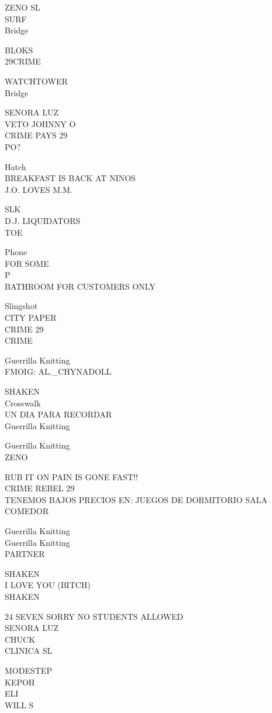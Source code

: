 \documentclass[10pt,letterpaper]{article}
\begin{document}
ZENO SL\\
SURF\\
Bridge

BLOKS\\
29CRIME

WATCHTOWER\\
Bridge

SENORA LUZ\\
VETO JOHNNY O\\
CRIME PAYS 29\\
PO?

Hatch\\
BREAKFAST IS BACK AT NINOS\\
J.O. LOVES M.M.

SLK\\
D.J. LIQUIDATORS\\
TOE

Phone\\
FOR SOME\\
P\\
BATHROOM FOR CUSTOMERS ONLY

Slingshot\\
CITY PAPER\\
CRIME 29\\
CRIME

Guerrilla Knitting\\
FMOIG: AL.\_CHYNADOLL

SHAKEN\\
Crosswalk\\
UN DIA PARA RECORDAR\\
Guerrilla Knitting

Guerrilla Knitting\\
ZENO

RUB IT ON PAIN IS GONE FAST!!\\
CRIME REBEL 29\\
TENEMOS BAJOS PRECIOS EN: JUEGOS DE DORMITORIO SALA COMEDOR

Guerrilla Knitting\\
Guerrilla Knitting\\
PARTNER

SHAKEN\\
I LOVE YOU (BITCH)\\
SHAKEN

24 SEVEN SORRY NO STUDENTS ALLOWED\\
SENORA LUZ\\
CHUCK\\
CLINICA SL

MODESTEP\\
KEPOH\\
ELI\\
WILL S
\end{document}

